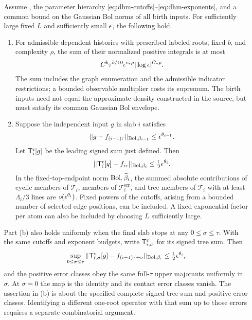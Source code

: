 \begin{theorem}\label{thm:dhm-package}
Assume , the parameter hierarchy
\eqref{eq:dhm-cutoffs}--\eqref{eq:dhm-exponents}, and a common bound on
the Gaussian Bol norms of all birth inputs. For sufficiently large
fixed \(L\) and sufficiently small \(\epsilon\), the following hold.
\begin{enumerate}[label=(\alph*)]
 \item For admissible dependent histories with prescribed labeled roots,
 fixed \(b\), and complexity \(\rho\), the sum of their normalized
 positive integrals is at most
 \begin{equation}\label{eq:dhm-coarse}
 C^b\tau^{b/10}\epsilon^{c_*\rho}
       |\log\epsilon|^{C_*\rho}.
 \end{equation}
 The sum includes the graph enumeration and the admissible indicator
 restrictions; a bounded observable multiplier costs its supremum.
 The birth inputs need not equal the approximate density constructed
 in the source, but must satisfy its common Gaussian Bol envelope.

 \item Suppose the independent input \(g\) in slab \(i\) satisfies
 \begin{equation}\label{eq:dhm-input-closeness}
 \|g-f_{(i-1)\tau}\|_{\mathrm{Bol},\beta_{i-1}}
       \le\epsilon^{\theta_{i-1}}.
 \end{equation}
 Let \(\mathsf T_i^\epsilon[g]\) be the leading signed sum just defined.
 Then
 \begin{equation}\label{eq:dhm-signed-trees}
 \|\mathsf T_i^\epsilon[g]-f_{i\tau}\|_{\mathrm{Bol},\beta_i}
       \le\tfrac12\epsilon^{\theta_i}.
 \end{equation}
 In the fixed-top-endpoint norm \(\mathrm{Bol},\widetilde\beta_i\), the summed
 absolute contributions of cyclic members of \(\mathcal T_i\), members
 of \(\mathcal T_i^{\mathrm{err}}\), and tree members of
 \(\mathcal T_i\) with at least \(\Lambda_i/3\) lines are
 \(o(\epsilon^{\theta_i})\). Fixed powers of the cutoffs, arising from a
 bounded number of selected edge positions, can be included. A fixed
 exponential factor per atom can also be included by choosing \(L\)
 sufficiently large.
\end{enumerate}
Part (b) also holds uniformly when the final slab stops at any
\(0\le\sigma\le\tau\). With the same cutoffs and exponent budgets,
write \(\mathsf T_{i,\sigma}^\epsilon\) for its signed tree sum. Then
\begin{equation}\label{eq:dhm-partial-slab}
 \sup_{0\le\sigma\le\tau}
 \|\mathsf T_{i,\sigma}^\epsilon[g]
          -f_{(i-1)\tau+\sigma}\|_{\mathrm{Bol},\beta_i}
       \le\tfrac12\epsilon^{\theta_i},
\end{equation}
and the positive error classes obey the same full-\(\tau\) upper
majorants uniformly in \(\sigma\). At \(\sigma=0\) the map is the
identity and its contact error classes vanish.
The assertion in (b) is about the specified complete signed tree sum
and positive error classes. Identifying a different one-root operator
with that sum up to those errors requires a separate combinatorial
argument.
\end{theorem}

